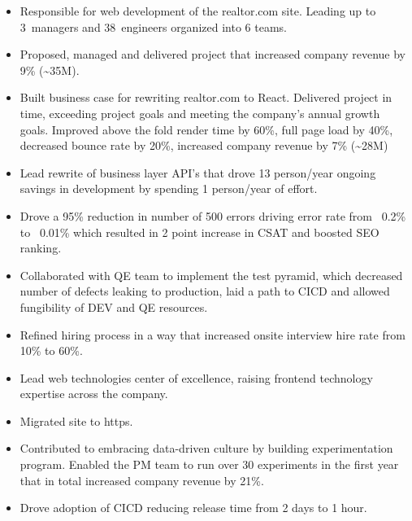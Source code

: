 \documentclass[11pt,a4paper,roman]{moderncv}       %
\begin{document}
\begin{itemize}
    \item Responsible for web development of the realtor.com site. Leading up to 3~managers and 38~engineers organized into 6 teams.  
    \item Proposed, managed and delivered project that increased company revenue by 9\% (\textasciitilde35M).
    \item Built business case for rewriting realtor.com to React. Delivered project in time, exceeding project goals and meeting the company's annual growth goals. Improved above the fold render time by 60\%, full page load by 40\%, decreased bounce rate by 20\%, increased company revenue by 7\% (\textasciitilde28M)
    \item Lead rewrite of business layer API's that drove 13 person/year ongoing savings in development by spending 1 person/year of effort.
    \item Drove a 95\% reduction in number of 500 errors driving error rate from ~0.2\% to ~0.01\% which resulted in 2 point increase in CSAT and boosted SEO ranking.
    \item Collaborated with QE team to implement the test pyramid, which decreased number of defects leaking to production, laid a path to CICD and allowed fungibility of DEV and QE resources.
    \item Refined hiring process in a way that increased onsite interview hire rate from 10\% to 60\%.
    \item Lead web technologies center of excellence, raising frontend technology expertise across the company.
    \item Migrated site to https.
    \item Contributed to embracing data-driven culture by building experimentation program. Enabled the PM team to run over 30 experiments in the first year that in total increased company revenue by 21\%.
    \item Drove adoption of CICD reducing release time from 2 days to 1 hour.
\end{itemize}

\bigskip


\end{document}
